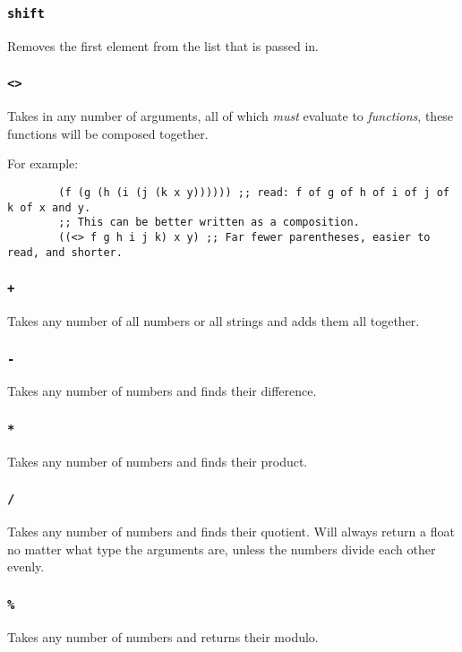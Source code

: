 \documentclass{article}
\newcommand{\code}[1]{\texttt{#1}}
\begin{document}
    \subsubsection{\code{shift}}
      Removes the first element from the list that is passed in.

    \subsubsection{\code{<>}}
      Takes in any number of arguments, all of which \emph{must} evaluate
      to \emph{functions}, these functions will be composed together.

      For example:
      \begin{verbatim}
        (f (g (h (i (j (k x y)))))) ;; read: f of g of h of i of j of k of x and y.
        ;; This can be better written as a composition.
        ((<> f g h i j k) x y) ;; Far fewer parentheses, easier to read, and shorter.
      \end{verbatim}

    \subsubsection{\code{+}}
      Takes any number of all numbers or all strings and adds
      them all together.

    \subsubsection{\code{-}}
      Takes any number of numbers and finds their difference.

    \subsubsection{\code{*}}
      Takes any number of numbers and finds their product.

    \subsubsection{\code{/}}
      Takes any number of numbers and finds their quotient.
      Will always return a float no matter what type the arguments are,
      unless the numbers divide each other evenly.

    \subsubsection{\code{\%}}
      Takes any number of numbers and returns their modulo.
\end{document}
